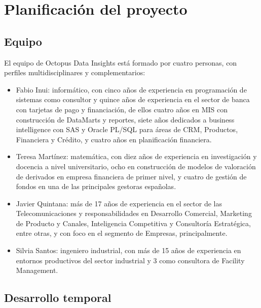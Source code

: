 \chapter{Planificación del proyecto}
\section{Equipo}
El equipo de Octopus Data Insights está formado por cuatro personas, con perfiles multidisciplinares y complementarios:
\begin{itemize}
\item Fabio Inui: informático, con cinco años de experiencia en programación de sistemas como consultor y quince años de experiencia en el sector de banca con tarjetas de pago y financiación, de ellos cuatro años en MIS con construcción de DataMarts y reportes, siete años dedicados a business intelligence con SAS y Oracle PL/SQL para áreas de CRM, Productos, Financiera y Crédito, y  cuatro años en planificación financiera.

\item Teresa Martínez: matemática, con diez años de experiencia en investigación y docencia a nivel universitario,
ocho en construcción de modelos de valoración de derivados en empresa financiera de primer nivel, y cuatro de
gestión de fondos en una de las principales gestoras españolas.
\item Javier Quintana: más de 17 años de experiencia en el sector de las Telecomunicaciones y responsabilidades en Desarrollo Comercial, Marketing de Producto y Canales, Inteligencia Competitiva y Consultoría Estratégica, entre otras, y con foco en el segmento de Empresas, principalmente.
\item Silvia Santos: ingeniero industrial, con más de 15 años de experiencia en entornos productivos del sector industrial y 3 como consultora de Facility Management.
\end{itemize}

\section{Desarrollo temporal}

